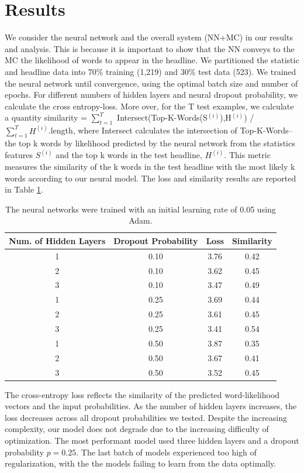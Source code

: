 \documentclass[12pt, journal]{IEEEtran}
\begin{document}
\section{Results}
We consider the neural network and the overall system (NN+MC) in our results and analysis. This is because it is important to show that the NN conveys to the MC the likelihood of words to appear in the headline. We partitioned the statistic and headline data into 70\% training (1,219) and 30\% test data (523). We trained the neural network until convergence, using the optimal batch size and number of epochs. For different numbers of hidden layers and neural dropout probability, we calculate the cross entropy-loss. More over, for the T test examples, we calculate a quantity similarity = $\sum_{t=1}^{T}$ Intersect(Top-K-Words(S$^{(i)}$),H$^{(i)}$) / $\sum_{t=1}^{T} H^{(i)}$.length, where Intersect calculates the intersection of Top-K-Words--the top k words by likelihood predicted by the neural network from the statistics features $S^{(i)}$ and the top k words in the test headline, $H^{(i)}$. This metric measures the similarity of the k words in the test headline with the most likely k words according to our neural model. The loss and similarity results are reported in Table \ref{table_example}. 

\begin{table}[!t]
\renewcommand{\arraystretch}{1.3}
\caption{The neural networks were trained with an initial learning rate of 0.05 using Adam.}
\label{table_example}
\centering
\begin{tabular}{|c||c||c||c|}
\hline
Num. of Hidden Layers & Dropout Probability & Loss & Similarity \\
\hline
1 & 0.10 & 3.76 & 0.42\\
2 & 0.10 & 3.62 & 0.45\\
3 & 0.10 & 3.47 & 0.49\\
1 & 0.25 & 3.69 & 0.44\\
2 & 0.25 & 3.61 & 0.45\\
3 & 0.25 & 3.41 & 0.54\\
1 & 0.50 & 3.87 & 0.35\\
2 & 0.50 & 3.67 & 0.41\\
3 & 0.50 & 3.52 & 0.45\\
\hline
\end{tabular}
\end{table}

The cross-entropy loss reflects the similarity of the predicted word-likelihood vectors and the input probabilities. As the number of hidden layers increases, the loss decreases across all dropout probabilities we tested. Despite the increasing complexity, our model does not degrade due to the increasing difficulty of optimization. The most performant model used three hidden layers and a dropout probability $p =0.25$. The last batch of models experienced too high of regularization, with the the models failing to learn from the data optimally. 
\end{document}

